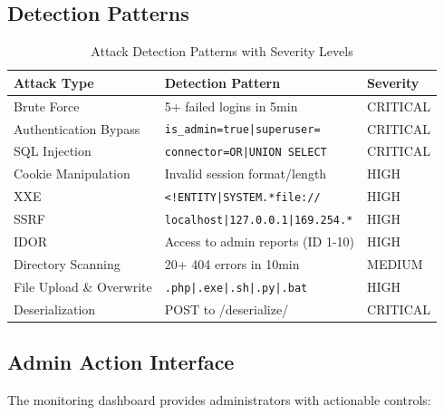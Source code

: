 \documentclass[12pt,a4paper]{article}
\begin{document}
\subsection{Detection Patterns}

\begin{table}[h]
\centering
\begin{tabular}{|p{3.5cm}|p{5cm}|p{2cm}|}
\hline
\textbf{Attack Type} & \textbf{Detection Pattern} & \textbf{Severity} \\
\hline
Brute Force & 5+ failed logins in 5min & CRITICAL \\
\hline
Authentication Bypass & \texttt{is\_admin=true|superuser=} & CRITICAL \\
\hline
SQL Injection & \texttt{connector=OR|UNION SELECT} & CRITICAL \\
\hline
Cookie Manipulation & Invalid session format/length & HIGH \\
\hline
XXE & \texttt{<!ENTITY|SYSTEM.*file://} & HIGH \\
\hline
SSRF & \texttt{localhost|127.0.0.1|169.254.*} & HIGH \\
\hline
IDOR & Access to admin reports (ID 1-10) & HIGH \\
\hline
Directory Scanning & 20+ 404 errors in 10min & MEDIUM \\
\hline
File Upload \& Overwrite & \texttt{.php|.exe|.sh|.py|.bat} & HIGH \\
\hline
Deserialization & POST to /deserialize/ & CRITICAL \\
\hline
\end{tabular}
\caption{Attack Detection Patterns with Severity Levels}
\end{table}

\subsection{Admin Action Interface}

The monitoring dashboard provides administrators with actionable controls:
\end{document}
